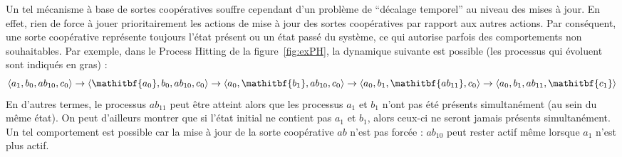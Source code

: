 Un tel mécanisme à base de sortes coopératives souffre cependant d'un problème de “décalage temporel” au niveau des mises à jour.
En effet, rien de force à jouer prioritairement les actions de mise à jour des sortes coopératives par rapport aux autres actions.
Par conséquent, une sorte coopérative représente toujours l'état présent ou un état passé du système, ce qui autorise parfois des comportements non souhaitables.
Par exemple, dans le Process Hitting de la figure~\ref{fig:exPH}, la dynamique suivante est possible (les processus qui évoluent sont indiqués en gras) :
$$
  \PHetat{a_1, b_0, ab_{10}, c_0} \rightarrow
  \PHetat{\mathitbf{a_0}, b_0, ab_{10}, c_0} \rightarrow
  \PHetat{a_0, \mathitbf{b_1}, ab_{10}, c_0} \rightarrow
  \PHetat{a_0, b_1, \mathitbf{ab_{11}}, c_0} \rightarrow
  \PHetat{a_0, b_1, ab_{11}, \mathitbf{c_1}}
$$
En d'autres termes, le processus $ab_{11}$ peut être atteint alors que les processus $a_1$ et $b_1$ n'ont pas été présents simultanément (\ie au sein du même état).
On peut d'ailleurs montrer que si l'état initial ne contient pas $a_1$ et $b_1$, alors ceux-ci ne seront jamais présents simultanément.
Un tel comportement est possible car la mise à jour de la sorte coopérative $ab$ n'est pas forcée :
$ab_{10}$ peut rester actif même lorsque $a_1$ n'est plus actif.

